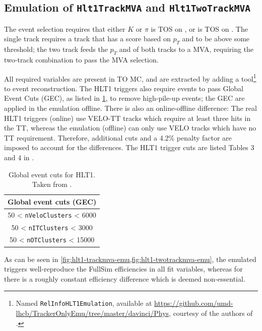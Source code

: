 \subsection{Emulation of \texttt{Hlt1TrackMVA} and \texttt{Hlt1TwoTrackMVA}}

The event selection requires that either $K$ or $\pi$ is TOS on
,
or \Dz is TOS on .
The single track  requires a track that has a score based
on $p_T$ and \ipChiSq to be above some threshold;
the two track  feeds the $p_T$ and \ipChiSq of both
tracks to a  MVA,
requiring the two-track combination to pass the MVA selection.

All required variables are present in TO MC, and are extracted by adding
a tool\footnote{
    Named \lstinline{RelInfoHLT1Emulation}, available at
    \url{https://github.com/umd-lhcb/TrackerOnlyEmu/tree/master/davinci/Phys},
    courtesy of the authors of \cite{LHCb-INT-2019-025}.
} to event reconstruction.
%
The HLT1 triggers also require events to pass Global Event Cuts (GEC),
as listed in \cref{tab:gec},
to remove high-pile-up events;
the GEC are applied in the emulation offline.
There is also an online-offline difference:
The real HLT1 triggers (online) use VELO-TT tracks which require at least three hits
in the TT,
whereas the emulation (offline) can only use VELO tracks which have no TT
requirement.
Therefore, additional cuts and a 4.2\% penalty factor are imposed to account for
the differences.
The HLT1 trigger cuts are listed Tables 3 and 4 in
\cite{LHCb-INT-2019-025}.

\begin{table}[!htb]
    \centering
    \caption{Global event cuts for HLT1. Taken from \cite{LHCb-INT-2019-025}.}
    \label{tab:gec}
    \begin{tabular}{c}
        \toprule
        {\bf Global event cuts (GEC)} \\
        \midrule
        50 < \texttt{nVeloClusters} < 6000 \\
        50 < \texttt{nITClusters} < 3000 \\
        50 < \texttt{nOTClusters} < 15000 \\
        \bottomrule
    \end{tabular}
\end{table}

As can be seen in \cref{fig:hlt1-trackmva-emu,fig:hlt1-twotrackmva-emu},
the emulated  triggers well-reproduce the FullSim
efficiencies in all fit variables,
whereas for  there is a roughly constant efficiency
difference which is deemed non-essential.


